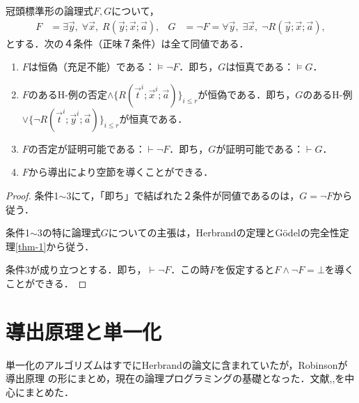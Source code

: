 \documentclass[uplatex,dvipdfmx]{jsarticle}
\begin{document}
\begin{corollary}\label{cor-1}
    冠頭標準形の論理式$F,G$について，
    \begin{align*}
        F&=\exists\vec{y},\;\forall\vec{x},\;R(\vec{y};\vec{x};\vec{a}),& G&=\lnot F=\forall\vec{y},\;\exists\vec{x},\;\lnot R(\vec{y};\vec{x};\vec{a}),
    \end{align*}
    とする．次の４条件（正味７条件）は全て同値である．
    \begin{enumerate}
        \item $F$は恒偽（充足不能）である：$\vDash\lnot F$．即ち，$G$は恒真である：$\vDash G$．
        \item $F$のあるH-例の否定$\land\{R(\vec{t}^i;\vec{x}^i;\vec{a})\}_{i\le r}$が恒偽である．即ち，$G$のあるH-例$\lor\{\lnot R(\vec{t}^i;\vec{y}^i;\vec{a})\}_{i\le r}$が恒真である．
        \item $F$の否定が証明可能である：$\vdash\lnot F$．即ち，$G$が証明可能である：$\vdash G$．
        \item $F$から導出により空節を導くことができる．
    \end{enumerate}
\end{corollary}
\begin{proof}
    条件1$\sim$3にて，「即ち」で結ばれた２条件が同値であるのは，$G=\lnot F$から従う．

    条件1$\sim$3の特に論理式$G$についての主張は，Herbrandの定理とGödelの完全性定理\ref{thm-1}から従う．

    条件3が成り立つとする．即ち，$\vdash\lnot F$．この時$F$を仮定すると$F\land\lnot F=\bot$を導くことができる．
\end{proof}

\section{導出原理と単一化}
単一化のアルゴリズムはすでにHerbrandの論文に含まれていた\cite{Prolog}が，Robinsonが導出原理
の形にまとめ，現在の論理プログラミングの基礎となった．文献\cite{新井敏康},\cite{resolution},\cite{SLD-resolution}を中心にまとめた．
\end{document}
